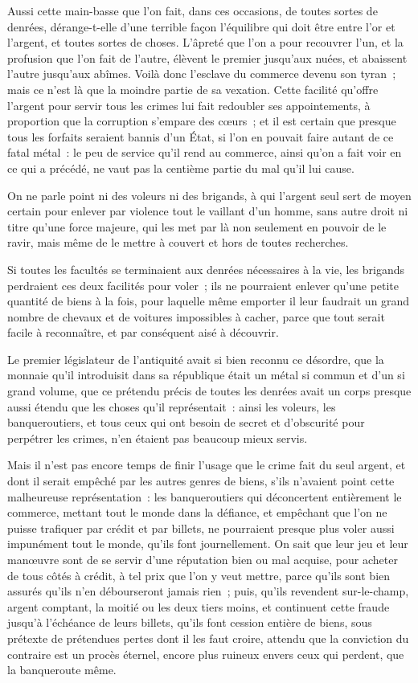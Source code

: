 \documentclass[french,twoside]{book} %
\begin{document}
Aussi cette main-basse que l’on fait, dans ces occasions, de toutes sortes de denrées, dérange-t-elle d’une terrible façon l’équilibre qui doit être entre l’or et l’argent, et toutes sortes de choses. L’âpreté que l’on a pour recouvrer l’un, et la profusion que l’on fait de l’autre, élèvent le premier jusqu’aux nuées, et abaissent l’autre jusqu’aux abîmes. Voilà donc l’esclave du commerce devenu son tyran ; mais ce n’est là que la moindre partie de sa vexation. Cette facilité qu’offre l’argent pour servir tous les crimes lui fait redoubler ses appointements, à proportion que la corruption s’empare des cœurs ; et il est certain que presque tous les forfaits seraient bannis d’un État, si l’on en pouvait faire autant de ce fatal métal : le peu de service qu’il rend au commerce, ainsi qu’on a fait voir en ce qui a précédé, ne vaut pas la centième partie du mal qu’il lui cause.\par
On ne parle point ni des voleurs ni des brigands, à qui l’argent seul sert de moyen certain pour enlever par violence tout le vaillant d’un homme, sans autre droit ni titre qu’une force majeure, qui les met par là non seulement en pouvoir de le ravir, mais même de le mettre à couvert et hors de toutes recherches.\par
Si toutes les facultés se terminaient aux denrées nécessaires à la vie, les brigands perdraient ces deux facilités pour voler ; ils ne pourraient enlever qu’une petite quantité de biens à la fois, pour laquelle même emporter il leur faudrait un grand nombre de chevaux et de voitures impossibles à cacher, parce que tout serait facile à reconnaître, et par conséquent aisé à découvrir.\par
Le premier législateur de l’antiquité avait si bien reconnu ce désordre, que la monnaie qu’il introduisit dans sa république était un métal si commun et d’un si grand volume, que ce prétendu précis de toutes les denrées avait un corps presque aussi étendu que les choses qu’il représentait : ainsi les voleurs, les banqueroutiers, et tous ceux qui ont besoin de secret et d’obscurité pour perpétrer les crimes, n’en étaient pas beaucoup mieux servis.\par
Mais il n’est pas encore temps de finir l’usage que le crime fait du seul argent, et dont il serait empêché par les autres genres de biens, s’ils n’avaient point cette malheureuse représentation : les banqueroutiers qui déconcertent entièrement le commerce, mettant tout le monde dans la défiance, et empêchant que l’on ne puisse trafiquer par crédit et par billets, ne pourraient presque plus voler aussi impunément tout le monde, qu’ils font journellement. On sait que leur jeu et leur manœuvre sont de se servir d’une réputation bien ou mal acquise, pour acheter de tous côtés à crédit, à tel prix que l’on y veut mettre, parce qu’ils sont bien assurés qu’ils n’en débourseront jamais rien ; puis, qu’ils revendent sur-le-champ, argent comptant, la moitié ou les deux tiers moins, et continuent cette fraude jusqu’à l’échéance de leurs billets, qu’ils font cession entière de biens, sous prétexte de prétendues pertes dont il les faut croire, attendu que la conviction du contraire est un procès éternel, encore plus ruineux envers ceux qui perdent, que la banqueroute même.\par
\end{document}
